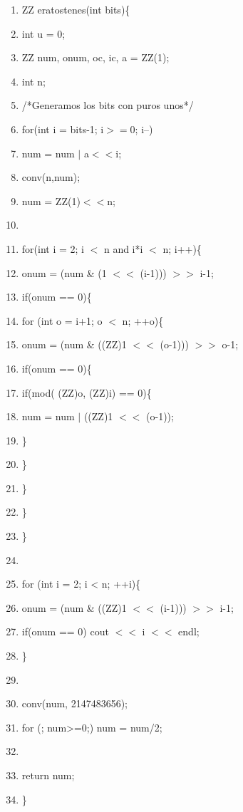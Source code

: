 \documentclass[11pt, conference]{IEEEtran}
\begin{document}
\begin{enumerate}
	\item ZZ eratostenes(int bits)\{
	\item \qquad int u = 0;
	\item \qquad ZZ num, onum, oc, ic, a = ZZ(1);
	\item \qquad int n;
	\item \qquad /*Generamos los bits con puros unos*/
	\item \qquad for(int i = bits-1; i$>=$0; i--)
	\item \qquad\qquad num = num $\rvert$ a$<<$i;
	\item \qquad conv(n,num);
	\item \qquad num = ZZ(1)$<<$n;
	\item	
	\item \qquad for(int i = 2; i $<$ n and i*i $<$ n; i++)\{
	\item \qquad\qquad onum = (num \& (1 $<<$ (i-1))) $>>$ i-1;
	\item \qquad\qquad if(onum == 0)\{
	\item \qquad\qquad\qquad for (int o = i+1; o $<$ n; ++o)\{
	\item \qquad\qquad\qquad\qquad onum = (num \& ((ZZ)1 $<<$ (o-1))) $>>$ o-1;
	\item \qquad\qquad\qquad\qquad if(onum == 0)\{	
	\item \qquad\qquad\qquad\qquad\qquad if(mod( (ZZ)o, (ZZ)i) == 0)\{
	\item \qquad\qquad\qquad\qquad\qquad\qquad num = num $\rvert$ ((ZZ)1 $<<$ (o-1));
	\item \qquad\qquad\qquad\qquad\qquad\}
	\item \qquad\qquad\qquad\qquad\}
	\item \qquad\qquad\qquad\}
	\item \qquad\qquad\}
	\item \qquad\}
	\item	
	\item \qquad for (int i = 2; i < n; ++i)\{
	\item \qquad\qquad onum = (num \& ((ZZ)1 $<<$ (i-1))) $>>$ i-1;
	\item \qquad\qquad if(onum == 0) cout $<<$ i $<<$ endl;
	\item \qquad\}
	\item	
	\item \qquad conv(num, 2147483656);
	\item \qquad for (; num>=0;) num = num/2;
	\item	
	\item \qquad return num;
	\item\}
\end{enumerate}
\end{document}
